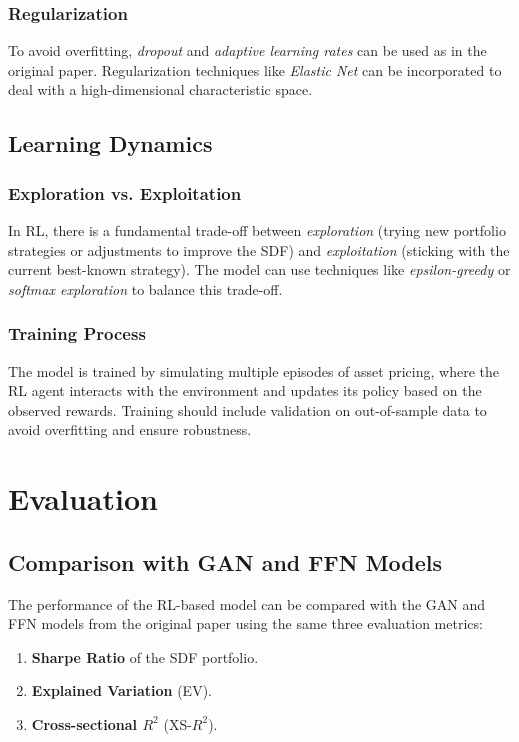 \subsubsection{Regularization}
To avoid overfitting, \textit{dropout} and \textit{adaptive learning rates} can be used as in the original paper. Regularization techniques like \textit{Elastic Net} can be incorporated to deal with a high-dimensional characteristic space.

\subsection{Learning Dynamics}

\subsubsection{Exploration vs. Exploitation}
In RL, there is a fundamental trade-off between \textit{exploration} (trying new portfolio strategies or adjustments to improve the SDF) and \textit{exploitation} (sticking with the current best-known strategy). The model can use techniques like \textit{epsilon-greedy} or \textit{softmax exploration} to balance this trade-off.

\subsubsection{Training Process}
The model is trained by simulating multiple episodes of asset pricing, where the RL agent interacts with the environment and updates its policy based on the observed rewards. Training should include validation on out-of-sample data to avoid overfitting and ensure robustness.

\section{Evaluation}

\subsection{Comparison with GAN and FFN Models}
The performance of the RL-based model can be compared with the GAN and FFN models from the original paper using the same three evaluation metrics:
\begin{enumerate}
    \item \textbf{Sharpe Ratio} of the SDF portfolio.
    \item \textbf{Explained Variation} (EV).
    \item \textbf{Cross-sectional $R^2$} (XS-$R^2$).
\end{enumerate}

